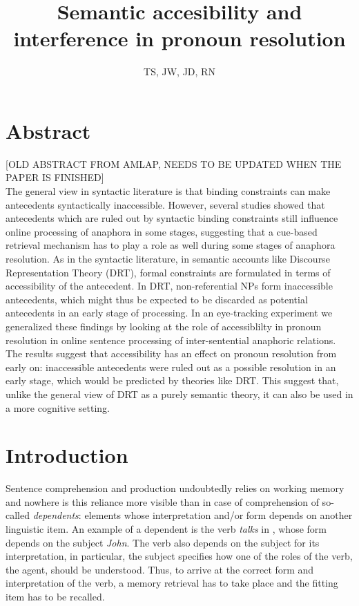 \documentclass[11pt]{article} %
\title{Semantic accesibility and interference in pronoun resolution\\}
\author{TS, JW, JD, RN}
\begin{document}
\maketitle

\section{Abstract}
[OLD ABSTRACT FROM AMLAP, NEEDS TO BE UPDATED WHEN THE PAPER IS FINISHED]\\

The general view in syntactic literature is that binding constraints can make antecedents syntactically inaccessible. However, several studies showed that antecedents which are ruled out by syntactic binding constraints still influence online processing of anaphora in some stages, suggesting that a cue-based retrieval mechanism has to play a role as well during some stages of anaphora resolution. As in the syntactic literature, in semantic accounts like Discourse Representation Theory (DRT), formal constraints are formulated in terms of accessibility of the antecedent. In DRT, non-referential NPs form inaccessible antecedents, which might thus be expected to be discarded as potential antecedents in an early stage of processing. In an eye-tracking experiment we generalized these findings by looking at the role of accessiblilty in pronoun resolution in online sentence processing of inter-sentential anaphoric relations. The results suggest that accessibility has an effect on pronoun resolution from early on: inaccessible antecedents were ruled out as a possible resolution in an early stage, which would be predicted by theories like DRT. This suggest that, unlike the general view of DRT as a purely semantic theory, it can also be used in a more cognitive setting.\\


\section{Introduction}
Sentence comprehension and production undoubtedly relies on working memory and nowhere is this reliance more visible than in case of comprehension of so-called \emph{dependents}: elements whose interpretation and/or form depends on another linguistic item. An example of a dependent is the verb \textit{talks} in \Next, whose form depends on the subject \textit{John}. The verb also depends on the subject for its interpretation, in particular, the subject specifies how one of the roles of the verb, the agent, should be understood. Thus, to arrive at the correct form and interpretation of the verb, a memory retrieval has to take place and the fitting item has to be recalled.
\end{document}

